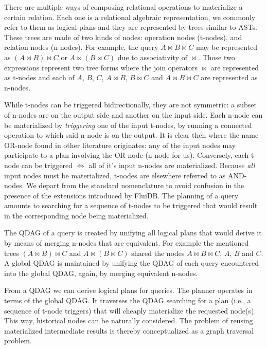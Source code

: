 There are multiple ways of composing relational operations to
materialize a certain relation. Each one is a relational algebraic
representation, we commonly refer to them as logical plans and they
are represented by trees similar to ASTs. These trees are made of two
kinds of nodes: operation nodes (t-nodes), and relation nodes
(n-nodes). For example, the query \(A \Join B \Join C\) may be
represented as \((A \Join B) \Join C\) or \(A \Join (B \Join C)\) due
to associativity of \(\Join\). Those two expressions represent two
tree forms where the join operators \(\Join\) are represented as
t-nodes and each of \(A\), \(B\), \(C\), \(A \Join B\), \(B \Join C\)
and \(A \Join B \Join C\) are represented as n-nodes.

While t-nodes can be triggered bidirectionally, they are not
symmetric: a subset of n-nodes are on the output side and another on
the input side. Each n-node can be materialized by \emph{triggering}
one of the input t-nodes, by running a connected operation to which
said n-node is on the output. It is clear then where the name OR-node
found in other literature originates: any of the input nodes may
participate to a plan involving the OR-node (n-node for
us). Conversely, each t-node can be triggered \(\iff\) all of it's
input n-nodes are materialized. Because \emph{all} input nodes must be
materialized, t-nodes are elsewhere referred to as AND-nodes. We
depart from the standard nomenclature to avoid confusion in the
presence of the extensions introduced by FluiDB. The planning of a
query amounts to searching for a sequence of t-nodes to be triggered
that would result in the corresponding node being materialized.

The QDAG of a query is created by unifying all logical plans that
would derive it by means of merging n-nodes that are equivalent. For
example the mentioned trees \((A \Join B) \Join C\) and \(A \Join (B
\Join C)\) shared the nodes \(A \Join B \Join C\), \(A\), \(B\) and
\(C\). A global QDAG is maintained by unifying the QDAG of each query
encountered into the global QDAG, again, by merging equivalent
n-nodes.

From a QDAG we can derive logical plans for queries. The planner
operates in terms of the global QDAG. It traverses the QDAG searching
for a plan (i.e., a sequence of t-node triggers) that will cheaply
materialize the requested node(s). This way, historical nodes can be
naturally considered. The problem of reusing materialized intermediate
results is thereby conceptualized as a graph traversal problem.

